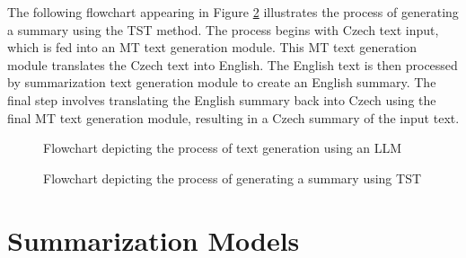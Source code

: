 \documentclass[english, ba, kiv, he, iso690numb, pdf, viewonly]{fasthesis}
\begin{document}
The following flowchart appearing in Figure \ref{fig:design2} illustrates the process of generating a summary using the TST method. The process begins with Czech text input, which is fed into an MT text generation module. This MT text generation module translates the Czech text into English. The English text is then processed by summarization text generation module to create an English summary. The final step involves translating the English summary back into Czech using the final MT text generation module, resulting in a Czech summary of the input text.
\begin{figure}[ht]
\centering
\caption{Flowchart depicting the process of text generation using an LLM}
\setlength{\fboxsep}{10pt}
\label{fig:design1}
\end{figure}

\begin{figure}[ht]
\centering
\caption{Flowchart depicting the process of generating a summary using TST}
\setlength{\fboxsep}{10pt}
\label{fig:design2}
\end{figure}

\section{Summarization Models}
\end{document}
